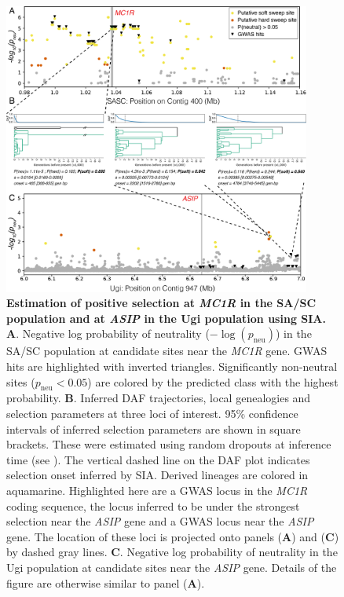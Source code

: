 \begin{figure}
    \centering
    \includegraphics[width=0.9\textwidth]{monarcha_figs/mon_F5.PNG}
    \caption[Estimation of positive selection at \textit{MC1R} in the \ac{SA/SC} population and at \textit{ASIP} in the Ugi population using \ac{SIA}.]{\textbf{Estimation of positive selection at \textit{MC1R} in the \ac{SA/SC} population and at \textit{ASIP} in the Ugi population using \ac{SIA}.} \textbf{A}. Negative log probability of neutrality ($-\log{(p_{\mathrm{neu}})}$) in the \ac{SA/SC} population at candidate sites near the \textit{MC1R} gene. \ac{GWAS} hits are highlighted with inverted triangles. Significantly non-neutral sites ($p_{\mathrm{neu}} < 0.05$) are colored by the predicted class with the highest probability. \textbf{B}. Inferred \acf{DAF} trajectories, local genealogies and selection parameters at three loci of interest. 95\% confidence intervals of inferred selection parameters are shown in square brackets. These were estimated using random dropouts at inference time (see ). The vertical dashed line on the \ac{DAF} plot indicates selection onset inferred by \ac{SIA}. Derived lineages are colored in aquamarine. Highlighted here are a \ac{GWAS} locus in the \textit{MC1R} coding sequence, the locus inferred to be under the strongest selection near the \textit{ASIP} gene and a \ac{GWAS} locus near the \textit{ASIP} gene. The location of these loci is projected onto panels (\textbf{A}) and (\textbf{C}) by dashed gray lines. \textbf{C}. Negative log probability of neutrality in the Ugi population at candidate sites near the \textit{ASIP} gene. Details of the figure are otherwise similar to panel (\textbf{A}).}
    \label{fig:mon-F5}
\end{figure}

